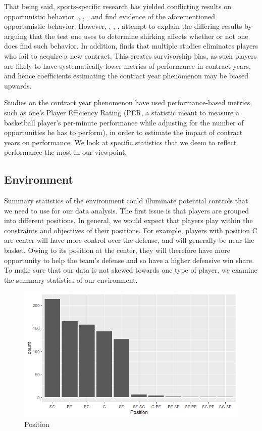 \documentclass[12pt]{article}
\begin{document}
	That being said, sports-specific research has yielded conflicting results on opportunistic behavior. \cite{lehn_1982}, \cite{scoggins_1993}, \cite{stiroh_2006}, and \cite{paulsen_2018} find evidence of the aforementioned opportunistic behavior. However, \cite{krautmann_1990}, \cite{maxcy_2002}, \cite{berri_2007}, \cite{krautmann_2009} attempt to explain the differing results by arguing that the test one uses to determine shirking affects whether or not one does find such behavior. In addition, \cite{ryan_show_2015} finds that multiple studies eliminates players who fail to acquire a new contract. This creates survivorship bias, as such players are likely to have systematically lower metrics of performance in contract years, and hence coefficients estimating the contract year phenomenon may be biased upwards.
	
	Studies on the contract year phenomenon have used performance-based metrics, such as one's Player Efficiency Rating (PER, a statistic meant to measure a basketball player's per-minute performance while adjusting for the number of opportunities he has to perform), in order to estimate the impact of contract years on performance. We look at specific statistics that we deem to reflect performance the most in our viewpoint. 
	
	\subsection{Environment}
	
	Summary statistics of the environment could illuminate potential controls that we need to use for our data analysis. The first issue is that players are grouped into different positions. In general, we would expect that players play within the constraints and objectives of their positions. For example, players with position C are center will have more control over the defense, and will generally be near the basket. Owing to its position at the center, they will therefore have more opportunity to help the team's defense and so have a higher defensive win share. To make sure that our data is not skewed towards one type of player, we examine the summary statistics of our environment.
	
	\begin{figure}[H]
		\centering
		\includegraphics[width=\textwidth]{position.png}
		\caption{Position}
		\label{fig:Position}
	\end{figure}
	
\end{document}
